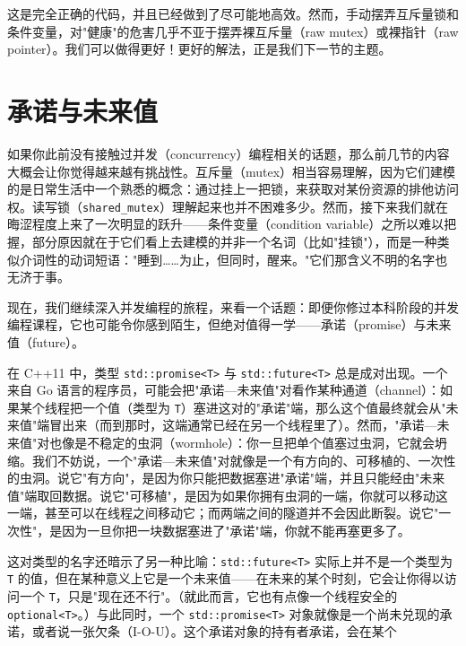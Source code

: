 这是完全正确的代码，并且已经做到了尽可能地高效。然而，手动摆弄互斥量锁和条件变量，对"健康"的危害几乎不亚于摆弄裸互斥量（raw mutex）或裸指针（raw pointer）。我们可以做得更好！更好的解法，正是我们下一节的主题。

\section{承诺与未来值}

如果你此前没有接触过并发（concurrency）编程相关的话题，那么前几节的内容大概会让你觉得越来越有挑战性。互斥量（mutex）相当容易理解，因为它们建模的是日常生活中一个熟悉的概念：通过挂上一把锁，来获取对某份资源的排他访问权。读写锁（\texttt{shared\_\allowbreak{}mutex}）理解起来也并不困难多少。然而，接下来我们就在晦涩程度上来了一次明显的跃升——条件变量（condition variable）之所以难以把握，部分原因就在于它们看上去建模的并非一个名词（比如"挂锁"），而是一种类似介词性的动词短语："睡到……为止，但同时，醒来。"它们那含义不明的名字也无济于事。

现在，我们继续深入并发编程的旅程，来看一个话题：即便你修过本科阶段的并发编程课程，它也可能令你感到陌生，但绝对值得一学——承诺（promise）与未来值（future）。

在 C++11 中，类型 \texttt{std::\allowbreak{}promise<\allowbreak{}T>\allowbreak{}} 与 \texttt{std::\allowbreak{}future<\allowbreak{}T>\allowbreak{}} 总是成对出现。一个来自 Go 语言的程序员，可能会把"承诺—未来值"对看作某种通道（channel）：如果某个线程把一个值（类型为 \texttt{T}）塞进这对的"承诺"端，那么这个值最终就会从"未来值"端冒出来（而到那时，这端通常已经在另一个线程里了）。然而，"承诺—未来值"对也像是不稳定的虫洞（wormhole）：你一旦把单个值塞过虫洞，它就会坍缩。我们不妨说，一个"承诺—未来值"对就像是一个有方向的、可移植的、一次性的虫洞。说它"有方向"，是因为你只能把数据塞进"承诺"端，并且只能经由"未来值"端取回数据。说它"可移植"，是因为如果你拥有虫洞的一端，你就可以移动这一端，甚至可以在线程之间移动它；而两端之间的隧道并不会因此断裂。说它"一次性"，是因为一旦你把一块数据塞进了"承诺"端，你就不能再塞更多了。

这对类型的名字还暗示了另一种比喻：\texttt{std::\allowbreak{}future<\allowbreak{}T>\allowbreak{}} 实际上并不是一个类型为 \texttt{T} 的值，但在某种意义上它是一个未来值——在未来的某个时刻，它会让你得以访问一个 \texttt{T}，只是"现在还不行"。（就此而言，它也有点像一个线程安全的 \texttt{optional<\allowbreak{}T>\allowbreak{}}。）与此同时，一个 \texttt{std::\allowbreak{}promise<\allowbreak{}T>\allowbreak{}} 对象就像是一个尚未兑现的承诺，或者说一张欠条（I-O-U）。这个承诺对象的持有者承诺，会在某个

